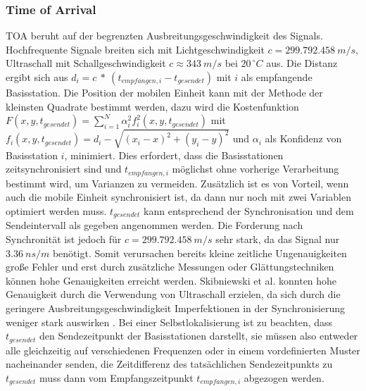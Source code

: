 \subsubsection{Time of Arrival}
TOA beruht auf der begrenzten Ausbreitungsgeschwindigkeit des Signals.
Hochfrequente Signale breiten sich mit Lichtgeschwindigkeit $c = 299.792.458\ m/s$, Ultraschall mit Schallgeschwindigkeit $c \approx 343\ m/s$ bei $20^{\ \circ}C$ aus. 
Die Distanz ergibt sich aus $d_i = c\ *\ (t_{empfangen,i} - t_{gesendet})$ mit $i$ als empfangende Basisstation.
Die Position der mobilen Einheit kann mit der Methode der kleinsten Quadrate bestimmt werden, dazu wird die Kostenfunktion $F(x,y,t_{gesendet}) = \sum_{i=1}^{N} {\alpha}^2_i f^2_i(x,y,t_{gesendet})$ mit $f_i(x,y,t_{gesendet}) = d_i - \sqrt{(x_i - x)^2 + (y_i - y)^2}$ und ${\alpha}_i$ als Konfidenz von Basisstation $i$, minimiert. Dies erfordert, dass die Basisstationen zeitsynchronisiert sind und $t_{empfangen,i}$ möglichst ohne vorherige Verarbeitung bestimmt wird, um Varianzen zu vermeiden. Zusätzlich ist es von Vorteil, wenn auch die mobile Einheit synchronisiert ist, da dann nur noch mit zwei Variablen optimiert werden muss. 
$t_{gesendet}$ kann entsprechend der Synchronisation und dem Sendeintervall als gegeben angenommen werden. 
Die Forderung nach Synchronität ist jedoch für $c = 299.792.458\ m/s$ sehr stark, da das Signal nur $3.36\ ns/m$ benötigt. 
Somit verursachen bereits kleine zeitliche Ungenauigkeiten große Fehler und erst durch zusätzliche Messungen oder Glättungstechniken können hohe Genauigkeiten erreicht werden. 
Skibniewski et al. konnten hohe Genauigkeit durch die Verwendung von Ultraschall erzielen, da sich durch die geringere Ausbreitungsgeschwindigkeit Imperfektionen in der Synchronisierung weniger stark auswirken \cite{skibniewski2009simulation}. 
Bei einer Selbstlokalisierung ist zu beachten, dass $t_{gesendet}$ den Sendezeitpunkt der Basisstationen darstellt, sie müssen also entweder alle gleichzeitig auf verschiedenen Frequenzen oder in einem vordefinierten Muster nacheinander senden, die Zeitdifferenz des tatsächlichen Sendezeitpunkts zu $t_{gesendet}$ muss dann vom Empfangszeitpunkt $t_{empfangen,i}$ abgezogen werden. 


